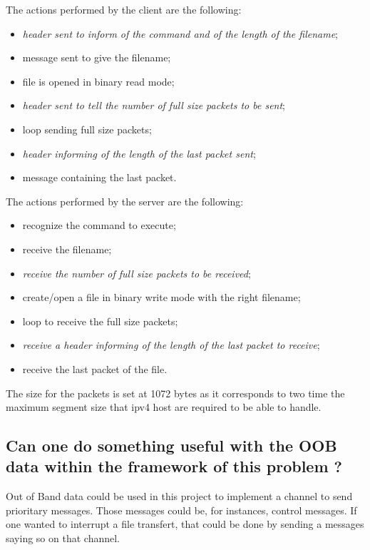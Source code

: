 \documentclass{article}
\begin{document}
The actions performed by the client are the following:
\begin{itemize}[noitemsep]
    \item \emph{header sent to inform of the command and of the length of the filename};
    \item message sent to give the filename;
    \item file is opened in binary read mode;
    \item \emph{header sent to tell the number of full size packets to be sent};
    \item loop sending full size packets;
    \item \emph{header informing of the length of the last packet sent};
    \item message containing the last packet.\\
\end{itemize}

The actions performed by the server are the following:
\begin{itemize}[noitemsep]
    \item recognize the command to execute;
    \item receive the filename;
    \item \emph{receive the number of full size packets to be received};
    \item create/open a file in binary write mode with the right filename;
    \item loop to receive the full size packets;
    \item \emph{receive a header informing of the length of the last packet to receive};
    \item receive the last packet of the file.\\
\end{itemize}

The size for the packets is set at 1072 bytes as it corresponds to two time the maximum segment size that ipv4 host are required to be able to handle.

\subsection{Can one do something useful with the OOB data within the framework of this problem ?}

Out of Band data could be used in this project to implement a channel to send prioritary messages. Those messages could be, for instances, control messages. If one wanted to interrupt a file transfert, that could be done by sending a messages saying so on that channel.
\end{document}

